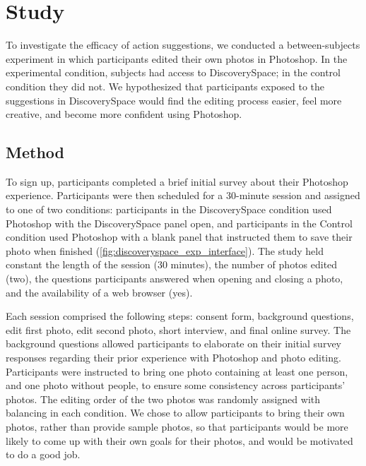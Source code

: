 \section{Study}
To investigate the efficacy of action suggestions, we conducted a between-subjects experiment in which participants edited their own photos in Photoshop. In the experimental condition, subjects had access to Discovery\-Space; in the control condition they did not. We hypothesized that participants exposed to the suggestions in Discovery\-Space would find the editing process easier, feel more creative, and become more confident using Photoshop. 

\subsection{Method}
To sign up, participants completed a brief initial survey about their Photoshop experience. Participants were then scheduled for a 30-minute session and assigned to one of two conditions: participants in the Discovery\-Space condition used Photoshop with the Discovery\-Space panel open, and participants in the Control condition used Photoshop with a blank panel that instructed them to save their photo when finished (\autoref{fig:discoveryspace_exp_interface}). The study held constant the length of the session (30 minutes), the number of photos edited (two), the questions participants answered when opening and closing a photo, and the availability of a web browser (yes). 

Each session comprised the following steps: consent form, background questions, edit first photo, edit second photo, short interview, and final online survey. The background questions allowed participants to elaborate on their initial survey responses regarding their prior experience with Photoshop and photo editing. Participants were instructed to bring one photo containing at least one person, and one photo without people, to ensure some consistency across participants' photos. The editing order of the two photos was randomly assigned with balancing in each condition. We chose to allow participants to bring their own photos, rather than provide sample photos, so that participants would be more likely to come up with their own goals for their photos, and would be motivated to do a good job. 

